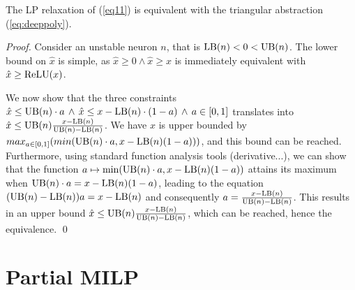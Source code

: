 



\begin{proposition}
	\cite{alessandro}
	\label{LP}
	The LP relaxation of (\ref{eq11}) is equivalent with the triangular abstraction 	(\ref{eq:deeppoly}).
\end{proposition}
 




\begin{proof}
	Consider an unstable neuron $n$, that is $\mathrm{LB}(n) < 0 < \mathrm{UB}(n)$.
The lower bound on $\hat{x}$ is simple, as $\hat{x} \geq 0 \wedge \hat{x} \geq x$ is immediately equivalent with $\hat{x} \geq \mathrm{ReLU}(x)$.

We now show that the three constraints 
$\hat{x} \leq \mathrm{UB}(n) \cdot a \, \wedge \, \hat{x} \leq x-\mathrm{LB}(n) \cdot (1-a) \, \wedge \, a \in [0,1]$ translates into $\hat{x} \leq \mathrm{UB}(n) \frac{x-\mathrm{LB}(n)}{\mathrm{UB}(n)-\mathrm{LB}(n)}$. 
We have $\hat{x}$ is upper bounded by $max_{a \in [0,1]} (min(\mathrm{UB}(n) \cdot a, x - \mathrm{LB}(n) (1-a)))$, and this bound can be reached. Furthermore, using standard function analysis tools (derivative...), we can show that the function $a \mapsto \min(\mathrm{UB}(n) \cdot a, x - \mathrm{LB}(n) (1-a))$ attains its maximum when $\mathrm{UB}(n) \cdot a = x - \mathrm{LB}(n) (1-a)$, leading to the equation $(\mathrm{UB}(n) - \mathrm{LB}(n)) a = x - \mathrm{LB}(n)$ and consequently $a = \frac{x - \mathrm{LB}(n)}{\mathrm{UB}(n)-\mathrm{LB}(n)}$. This results in an upper bound $\hat{x} \leq \mathrm{UB}(n) \frac{x - \mathrm{LB}(n)}{\mathrm{UB}(n)-\mathrm{LB}(n)}$, which can be reached, hence the equivalence.
\qed
\end{proof}













\section{Partial MILP}	

